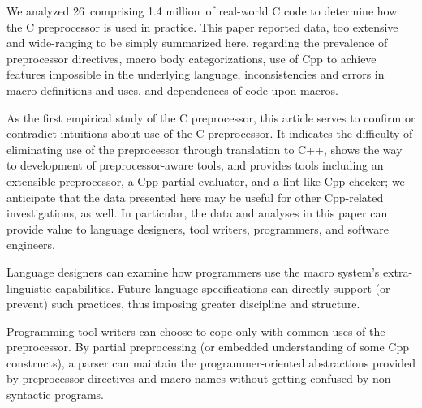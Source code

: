 \documentclass[10pt]{article}
\def\numpackages{26}
\def\numlines{1.4 million}      %
\begin{document}



We analyzed \numpackages\ comprising \numlines\ of real-world C code to
determine how the C preprocessor is used in practice.  This paper reported
data, too extensive and wide-ranging to be simply summarized here,
regarding the prevalence of preprocessor directives, macro body
categorizations, use of Cpp to achieve features impossible in the
underlying language, inconsistencies and errors in macro definitions and
uses, and dependences of code upon macros.

As the first empirical study of the C preprocessor, this article serves to
confirm or contradict intuitions about use of the C preprocessor.  It
indicates the difficulty of eliminating use of the preprocessor through
translation to C++, shows the way to development of preprocessor-aware
tools, and provides tools including an extensible preprocessor, a Cpp
partial evaluator, and a lint-like Cpp checker; we anticipate that the data
presented here may be useful for other Cpp-related investigations, as well.
In particular,
the data and analyses in this paper can provide value to language
designers, tool writers, programmers, and software engineers.

Language designers can examine how programmers use the macro system's
extra-linguistic capabilities.  Future language specifications can
directly support (or prevent) such practices, thus imposing greater
discipline and structure.  


Programming tool writers can choose to cope only with common uses of
the preprocessor.  By partial preprocessing (or embedded understanding
of some Cpp constructs), a parser can maintain the programmer-oriented
abstractions provided by preprocessor directives and macro names without
getting confused by non-syntactic programs.  
\end{document}
